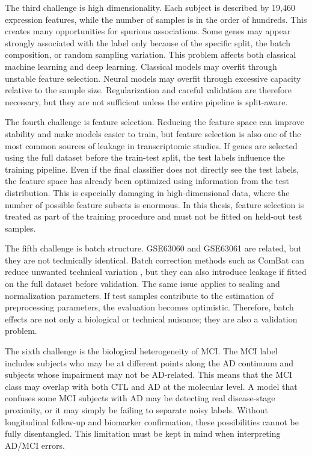 The third challenge is high dimensionality. Each subject is described by 19,460 expression features, while the number of samples is in the order of hundreds. This creates many opportunities for spurious associations. Some genes may appear strongly associated with the label only because of the specific split, the batch composition, or random sampling variation. This problem affects both classical machine learning and deep learning. Classical models may overfit through unstable feature selection. Neural models may overfit through excessive capacity relative to the sample size. Regularization and careful validation are therefore necessary, but they are not sufficient unless the entire pipeline is split-aware.

The fourth challenge is feature selection. Reducing the feature space can improve stability and make models easier to train, but feature selection is also one of the most common sources of leakage in transcriptomic studies. If genes are selected using the full dataset before the train-test split, the test labels influence the training pipeline. Even if the final classifier does not directly see the test labels, the feature space has already been optimized using information from the test distribution. This is especially damaging in high-dimensional data, where the number of possible feature subsets is enormous. In this thesis, feature selection is treated as part of the training procedure and must not be fitted on held-out test samples.

The fifth challenge is batch structure. GSE63060 and GSE63061 are related, but they are not technically identical. Batch correction methods such as ComBat can reduce unwanted technical variation \cite{johnson2007combat}, but they can also introduce leakage if fitted on the full dataset before validation. The same issue applies to scaling and normalization parameters. If test samples contribute to the estimation of preprocessing parameters, the evaluation becomes optimistic. Therefore, batch effects are not only a biological or technical nuisance; they are also a validation problem.

The sixth challenge is the biological heterogeneity of MCI. The MCI label includes subjects who may be at different points along the AD continuum and subjects whose impairment may not be AD-related. This means that the MCI class may overlap with both CTL and AD at the molecular level. A model that confuses some MCI subjects with AD may be detecting real disease-stage proximity, or it may simply be failing to separate noisy labels. Without longitudinal follow-up and biomarker confirmation, these possibilities cannot be fully disentangled. This limitation must be kept in mind when interpreting AD/MCI errors.

